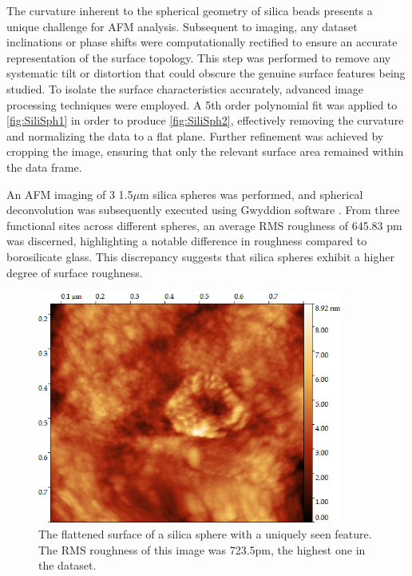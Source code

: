 The curvature inherent to the spherical geometry of silica beads presents a unique challenge for AFM analysis. Subsequent to imaging, any dataset inclinations or phase shifts were computationally rectified to ensure an accurate representation of the surface topology. This step was performed to remove any systematic tilt or distortion that could obscure the genuine surface features being studied. To isolate the surface characteristics accurately, advanced image processing techniques were employed. A 5th order polynomial fit was applied to \ref{fig:SiliSph1} in order to produce \ref{fig:SiliSph2}, effectively removing the curvature and normalizing the data to a flat plane. Further refinement was achieved by cropping the image, ensuring that only the relevant surface area remained within the data frame.

An AFM imaging of 3 1.5$\mu$m silica spheres was performed, and spherical deconvolution was subsequently executed using Gwyddion software \cite{gwy}. From three functional sites across different spheres, an average RMS roughness of 645.83 pm was discerned, highlighting a notable difference in roughness compared to borosilicate glass. This discrepancy suggests that silica spheres exhibit a higher degree of surface roughness.

\begin{figure}[h!!!!!]     %
        \begin{center}
          \includegraphics[width=100mm]{chapter3/Sili2.png}
\end{center}
\caption{The flattened surface of a silica sphere with a uniquely seen feature. The RMS roughness of this image was 723.5pm, the highest one in the dataset.}
\label{fig:SiliSph3}                 %
\end{figure}


